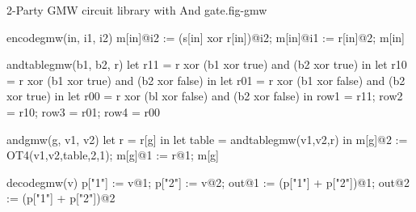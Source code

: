\begin{fpfig}[t]{2-Party GMW circuit library with And gate.}{fig-gmw}
{\footnotesize
  \begin{verbatimtab}
    encodegmw(in, i1, i2) {
      m[in]@i2 := (s[in] xor r[in])@i2;
      m[in]@i1 := r[in]@2;
      m[in]
    }
    
    andtablegmw(b1, b2, r) {
      let r11 = r xor (b1 xor true) and (b2 xor true) in
      let r10 = r xor (b1 xor true) and (b2 xor false) in
      let r01 = r xor (b1 xor false) and (b2 xor true) in
      let r00 = r xor (bl xor false) and (b2 xor false) in
      { row1 = r11; row2 = r10; row3 = r01; row4 = r00 }
    }
    
    andgmw(g, v1, v2) {
      let r = r[g] in
      let table = andtablegmw(v1,v2,r) in
      m[g]@2 := OT4(v1,v2,table,2,1);
      m[g]@1 := r@1;
      m[g]
    }
    
    decodegmw(v) {
      p["1"] := v@1; p["2"] := v@2;
      out@1 := (p["1"] + p["2"])@1;
      out@2 := (p["1"] + p["2"])@2
    }
  \end{verbatimtab}
}
\end{fpfig}
